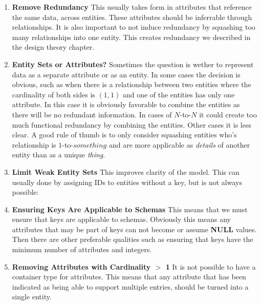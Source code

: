 \documentclass{report}
\begin{document}
\begin{enumerate}
    \item \textbf{Remove Redundancy} This usually takes form in attributes that reference the same data, across entities. These attributes should be inferrable through relationships. It is also important to not induce redundancy by squashing too many relationships into one entity. This creates redundancy we described in the design theory chapter.
    \item \textbf{Entity Sets or Attributes?} Sometimes the question is wether to represent data as a separate attribute or as an entity. In some cases the decision is obvious, such as when there is a relationship between two entities where the cardinality of both sides is $(1,1)$ and one of the entities has only one attribute. In this case it is obviously favorable to combine the entities as there will be no redundant information. In cases of $N$-to-$N$ it could create too much functional redundancy by combining the entities. Other cases it is less clear. A good rule of thumb is to only consider squashing entities who's relationship is $1$-to-$something$ and  are more applicable as \textit{details} of another entity than as a unique \textit{thing}. 
    \item \textbf{Limit Weak Entity Sets} This improves clarity of the model. This can usually done by assigning IDs to entities without a key, but is not always possible:
    \item \textbf{Ensuring Keys Are Applicable to Schemas} This means that we must ensure that keys are applicable to schemas. Obviously this means any attributes that may be part of keys can not become or assume \textbf{NULL} values. Then there are other preferable qualities such as ensuring that keys have the minimum number of attributes and integers.
    \item \textbf{Removing Attributes with Cardinality $>$ 1} It is not possible to have a container type for attributes. This means that any attribute that has been indicated as being able to support multiple entries, should be turned into a single entity.
\end{enumerate}
\end{document}
